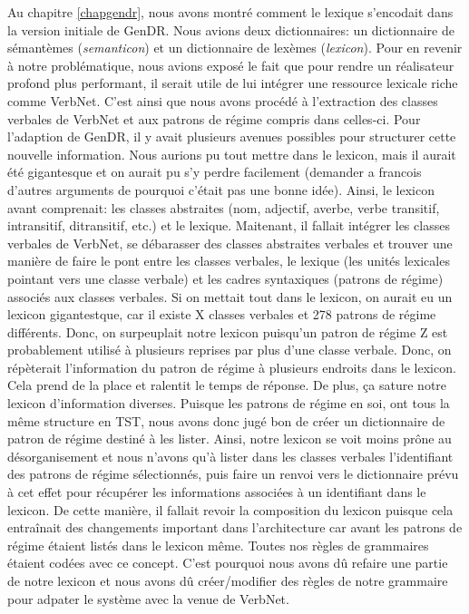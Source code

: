 Au chapitre \ref{chapgendr}, nous avons montré comment le lexique s'encodait dans la version initiale de GenDR. Nous avions deux dictionnaires: un dictionnaire de sémantèmes (\emph{semanticon}) et un dictionnaire de lexèmes (\emph{lexicon}). Pour en revenir à notre problématique, nous avions exposé le fait que pour rendre un réalisateur profond plus performant, il serait utile de lui intégrer une ressource lexicale riche comme VerbNet. C'est ainsi que nous avons procédé à l'extraction des classes verbales de VerbNet et aux patrons de régime compris dans celles-ci. Pour l'adaption de GenDR, il y avait plusieurs avenues possibles pour structurer cette nouvelle information. Nous aurions pu tout mettre dans le lexicon, mais il aurait été gigantesque et on aurait pu s'y perdre facilement (demander a francois d'autres arguments de pourquoi c'était pas une bonne idée). Ainsi, le lexicon avant comprenait: les classes abstraites (nom, adjectif, averbe, verbe transitif, intransitif, ditransitif, etc.) et le lexique. Maitenant, il fallait intégrer les classes verbales de VerbNet, se débarasser des classes abstraites verbales et trouver une manière de faire le pont entre les classes verbales, le lexique (les unités lexicales pointant vers une classe verbale) et les cadres syntaxiques (patrons de régime) associés aux classes verbales. Si on mettait tout dans le lexicon, on aurait eu un lexicon gigantestque, car il existe X classes verbales et 278 patrons de régime différents. Donc, on surpeuplait notre lexicon puisqu'un patron de régime Z est probablement utilisé à plusieurs reprises par plus d'une classe verbale. Donc, on répèterait l'information du patron de régime à plusieurs endroits dans le lexicon. Cela prend de la place et ralentit le temps de réponse. De plus, ça sature notre lexicon d'information diverses. Puisque les patrons de régime en soi, ont tous la même structure en TST, nous avons donc jugé bon de créer un dictionnaire de patron de régime destiné à les lister. Ainsi, notre lexicon se voit moins prône au désorganisement et nous n'avons qu'à lister dans les classes verbales l'identifiant des patrons de régime sélectionnés, puis faire un renvoi vers le dictionnaire prévu à cet effet pour récupérer les informations associées à un identifiant dans le lexicon. De cette manière, il fallait revoir la composition du lexicon puisque cela entraînait des changements important dans l'architecture car avant les patrons de régime étaient listés dans le lexicon même. Toutes nos règles de grammaires étaient codées avec ce concept. C'est pourquoi nous avons dû refaire une partie de notre lexicon et nous avons dû créer/modifier des règles de notre grammaire pour adpater le système avec la venue de VerbNet.

